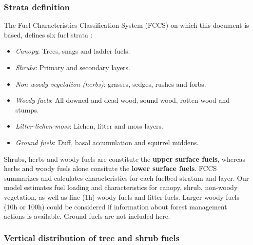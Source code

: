 \documentclass[]{book}
\providecommand{\tightlist}{%
  \setlength{\itemsep}{0pt}\setlength{\parskip}{0pt}}
\begin{document}
\hypertarget{strata-definition}{%
\subsubsection{Strata definition}\label{strata-definition}}

The Fuel Characteristics Classification System (FCCS) on which this document is based, defines six fuel strata \citep{Prichard2013}:

\begin{itemize}
\tightlist
\item
  \emph{Canopy}: Trees, snags and ladder fuels.
\item
  \emph{Shrubs}: Primary and secondary layers.
\item
  \emph{Non-woody vegetation (herbs)}: grasses, sedges, rushes and forbs.
\item
  \emph{Woody fuels}: All downed and dead wood, sound wood, rotten wood and stumps.
\item
  \emph{Litter-lichen-moss}: Lichen, litter and moss layers.
\item
  \emph{Ground fuels}: Duff, basal accumulation and squirrel middens.
\end{itemize}

Shrubs, herbs and woody fuels are constitute the \textbf{upper surface fuels}, whereas herbs and woody fuels alone consitute the \textbf{lower surface fuels}. FCCS summarizes and calculates characteristics for each fuelbed stratum and layer. Our model estimates fuel loading and characteristics for canopy, shrub, non-woody vegetation, as well as fine (1h) woody fuels and litter fuels. Larger woody fuels (10h or 100h) could be considered if information about forest management actions is available. Ground fuels are not included here.

\hypertarget{vertical-distribution-of-tree-and-shrub-fuels}{%
\subsubsection{Vertical distribution of tree and shrub fuels}\label{vertical-distribution-of-tree-and-shrub-fuels}}
\end{document}
